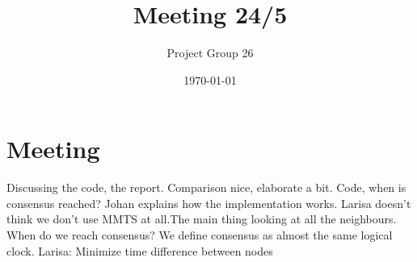\documentclass{article}
\title{Meeting 24/5}
\author{Project Group 26}
\date{\today}
\begin{document}
\maketitle

\section{Meeting}

Discussing the code, the report. Comparison nice, elaborate a bit. Code, when is consensus reached? Johan explains how the implementation works. Larisa doesn't think we don't use MMTS at all.The main thing looking at all the neighbours. When do we reach consensus? We define consensus as almost the same logical clock. Larisa: Minimize time difference between nodes
\end{document}
